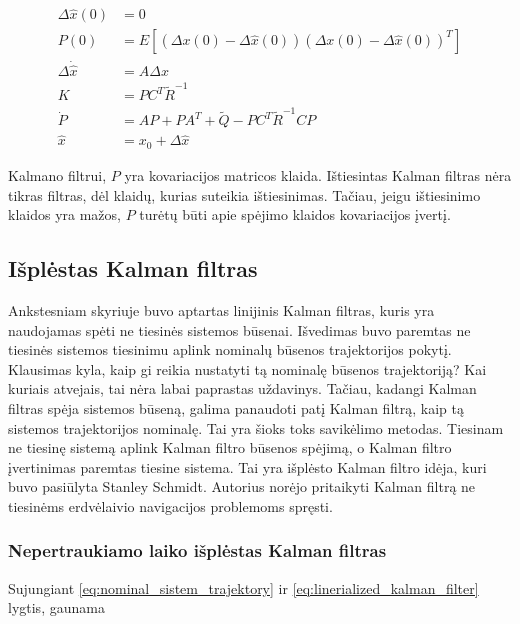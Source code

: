     \begin{equation}
        \label{eq:linerialized_kalman_filter}
        \begin{aligned}
            \Delta \hat{x} (0) &= 0\\
            P(0) &= E[(\Delta x(0) - \Delta \hat{x}(0))(\Delta{x}(0) - \Delta \hat{x}(0))^T]\\
            \Delta \dot{\hat{x}} &= A \Delta \hat{x} \\
            K &= PC^T\tilde{R}^{-1}\\
            \dot{P} &= AP + PA^T + \tilde{Q} - PC^T\tilde{R}^{-1}CP\\
            \hat{x} &= x_0 + \Delta \hat{x}
        \end{aligned}
    \end{equation}

    Kalmano filtrui, $P$ yra kovariacijos matricos klaida.
    Ištiesintas Kalman filtras nėra tikras filtras, dėl klaidų, kurias suteikia ištiesinimas.
    Tačiau, jeigu ištiesinimo klaidos yra mažos, $P$ turėtų būti apie spėjimo klaidos kovariacijos įvertį.


\subsection{Išplėstas Kalman filtras}

    Ankstesniam skyriuje buvo aptartas linijinis Kalman filtras, kuris yra naudojamas spėti ne tiesinės sistemos būsenai.
    Išvedimas buvo paremtas ne tiesinės sistemos tiesinimu aplink nominalų būsenos trajektorijos pokytį.
    Klausimas kyla, kaip gi reikia nustatyti tą nominalę būsenos trajektoriją?
    Kai kuriais atvejais, tai nėra labai paprastas uždavinys.
    Tačiau, kadangi Kalman filtras spėja sistemos būseną, galima panaudoti patį Kalman filtrą, kaip tą sistemos trajektorijos nominalę.
    Tai yra šioks toks savikėlimo metodas.
    Tiesinam ne tiesinę sistemą aplink Kalman filtro būsenos spėjimą, o Kalman filtro įvertinimas paremtas tiesine sistema.
    Tai yra išplėsto Kalman filtro idėja, kuri buvo pasiūlyta Stanley Schmidt.
    Autorius norėjo pritaikyti Kalman filtrą ne tiesinėms erdvėlaivio navigacijos problemoms spręsti.

\subsubsection{Nepertraukiamo laiko išplėstas Kalman filtras}

        Sujungiant \ref{eq:nominal_sistem_trajektory} ir \ref{eq:linerialized_kalman_filter} lygtis, gaunama

